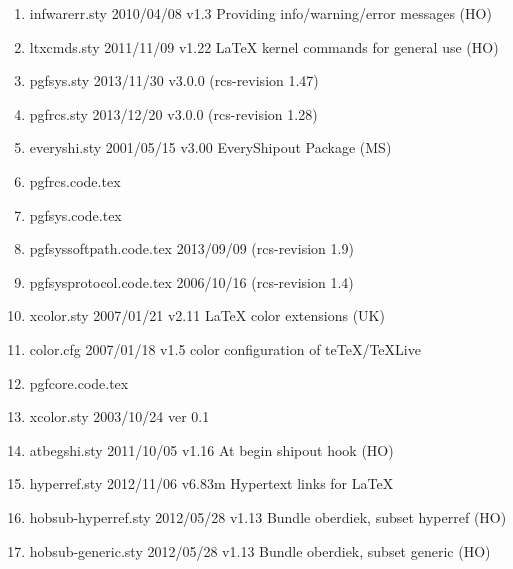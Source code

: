 \begin{enumerate}
\item infwarerr.sty 2010/04/08 v1.3 Providing info/warning/error messages (HO)
\item 		 ltxcmds.sty 2011/11/09 v1.22 LaTeX kernel commands for general use (HO)
\item 		 pgfsys.sty 2013/11/30 v3.0.0 (rcs-revision 1.47)
\item 		 pgfrcs.sty 2013/12/20 v3.0.0 (rcs-revision 1.28)
\item 		 everyshi.sty 2001/05/15 v3.00 EveryShipout Package (MS)
\item 		 pgfrcs.code.tex
\item 		 pgfsys.code.tex
\item 		 pgfsyssoftpath.code.tex 2013/09/09 (rcs-revision 1.9)
\item 		 pgfsysprotocol.code.tex 2006/10/16 (rcs-revision 1.4)
\item 		 xcolor.sty 2007/01/21 v2.11 LaTeX color extensions (UK)
\item 		 color.cfg 2007/01/18 v1.5 color configuration of teTeX/TeXLive
\item 		 pgfcore.code.tex
\item 	xcolor.sty 2003/10/24 ver 0.1
\item 		 atbegshi.sty 2011/10/05 v1.16 At begin shipout hook (HO)
\item 		 hyperref.sty 2012/11/06 v6.83m Hypertext links for LaTeX
\item hobsub-hyperref.sty 2012/05/28 v1.13 Bundle oberdiek, subset hyperref (HO)
\item 		 hobsub-generic.sty 2012/05/28 v1.13 Bundle oberdiek, subset generic (HO)

\end{enumerate}
